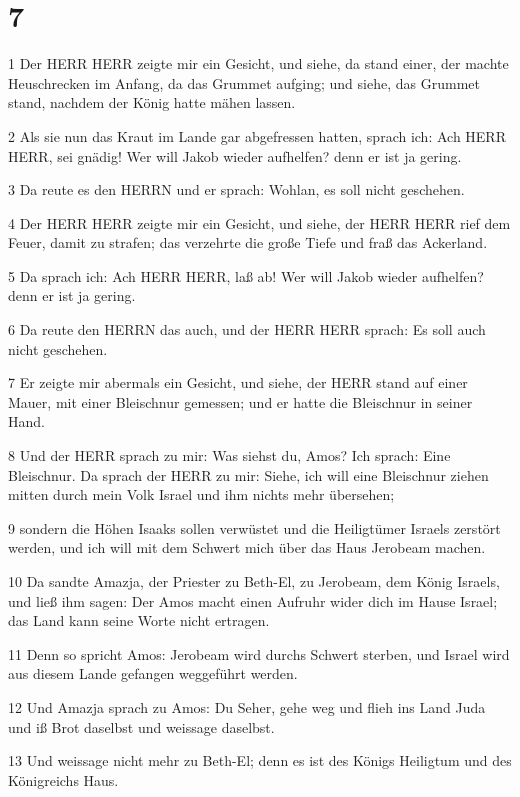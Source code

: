 \chapter{7}

\par 1 Der HERR HERR zeigte mir ein Gesicht, und siehe, da stand einer, der machte Heuschrecken im Anfang, da das Grummet aufging; und siehe, das Grummet stand, nachdem der König hatte mähen lassen.
\par 2 Als sie nun das Kraut im Lande gar abgefressen hatten, sprach ich: Ach HERR HERR, sei gnädig! Wer will Jakob wieder aufhelfen? denn er ist ja gering.
\par 3 Da reute es den HERRN und er sprach: Wohlan, es soll nicht geschehen.
\par 4 Der HERR HERR zeigte mir ein Gesicht, und siehe, der HERR HERR rief dem Feuer, damit zu strafen; das verzehrte die große Tiefe und fraß das Ackerland.
\par 5 Da sprach ich: Ach HERR HERR, laß ab! Wer will Jakob wieder aufhelfen? denn er ist ja gering.
\par 6 Da reute den HERRN das auch, und der HERR HERR sprach: Es soll auch nicht geschehen.
\par 7 Er zeigte mir abermals ein Gesicht, und siehe, der HERR stand auf einer Mauer, mit einer Bleischnur gemessen; und er hatte die Bleischnur in seiner Hand.
\par 8 Und der HERR sprach zu mir: Was siehst du, Amos? Ich sprach: Eine Bleischnur. Da sprach der HERR zu mir: Siehe, ich will eine Bleischnur ziehen mitten durch mein Volk Israel und ihm nichts mehr übersehen;
\par 9 sondern die Höhen Isaaks sollen verwüstet und die Heiligtümer Israels zerstört werden, und ich will mit dem Schwert mich über das Haus Jerobeam machen.
\par 10 Da sandte Amazja, der Priester zu Beth-El, zu Jerobeam, dem König Israels, und ließ ihm sagen: Der Amos macht einen Aufruhr wider dich im Hause Israel; das Land kann seine Worte nicht ertragen.
\par 11 Denn so spricht Amos: Jerobeam wird durchs Schwert sterben, und Israel wird aus diesem Lande gefangen weggeführt werden.
\par 12 Und Amazja sprach zu Amos: Du Seher, gehe weg und flieh ins Land Juda und iß Brot daselbst und weissage daselbst.
\par 13 Und weissage nicht mehr zu Beth-El; denn es ist des Königs Heiligtum und des Königreichs Haus.
